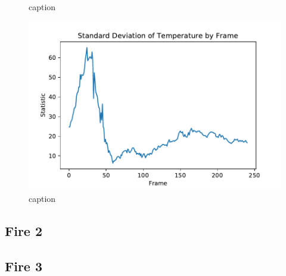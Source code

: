 \documentclass{article}
\begin{document}
\begin{figure}[ht]
\begin{minipage}[b]{1\linewidth}
    \caption{caption} 
    \vspace{4ex}
  \end{minipage}%
  \begin{minipage}[b]{1\linewidth}
    \centering
    \includegraphics[width=0.8\linewidth]{../plots/f1_stdtemp.pdf} 
    \caption{caption} 
    \vspace{4ex}
  \end{minipage} 
\end{figure}

\subsection{Fire 2}

\subsection{Fire 3}
\end{document}

